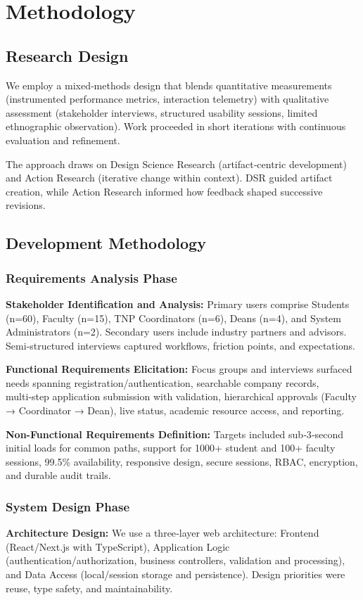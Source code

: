 \documentclass[conference]{IEEEtran}
\begin{document}
\section{Methodology}

\subsection{Research Design}
We employ a mixed‑methods design that blends quantitative measurements (instrumented performance metrics, interaction telemetry) with qualitative assessment (stakeholder interviews, structured usability sessions, limited ethnographic observation). Work proceeded in short iterations with continuous evaluation and refinement.

The approach draws on Design Science Research (artifact‑centric development) and Action Research (iterative change within context). DSR guided artifact creation, while Action Research informed how feedback shaped successive revisions.

\subsection{Development Methodology}

\subsubsection{Requirements Analysis Phase}
\textbf{Stakeholder Identification and Analysis:} Primary users comprise Students (n=60), Faculty (n=15), TNP Coordinators (n=6), Deans (n=4), and System Administrators (n=2). Secondary users include industry partners and advisors. Semi‑structured interviews captured workflows, friction points, and expectations.

\textbf{Functional Requirements Elicitation:} Focus groups and interviews surfaced needs spanning registration/authentication, searchable company records, multi‑step application submission with validation, hierarchical approvals (Faculty → Coordinator → Dean), live status, academic resource access, and reporting.

\textbf{Non-Functional Requirements Definition:} Targets included sub‑3‑second initial loads for common paths, support for 1000+ student and 100+ faculty sessions, 99.5\% availability, responsive design, secure sessions, RBAC, encryption, and durable audit trails.

\subsubsection{System Design Phase}
\textbf{Architecture Design:} We use a three‑layer web architecture: Frontend (React/Next.js with TypeScript), Application Logic (authentication/authorization, business controllers, validation and processing), and Data Access (local/session storage and persistence). Design priorities were reuse, type safety, and maintainability.
\end{document}
